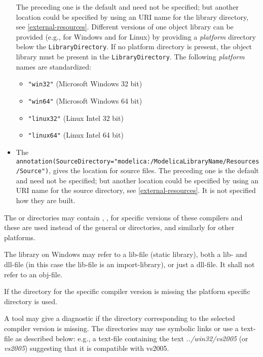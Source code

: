 \begin{itemize}
  The preceding one is the default and need not be specified; but another location could be specified by using an URI name for the library directory, see \cref{external-resources}.
  Different versions of one object library can be provided (e.g., for Windows and for Linux) by providing a \emph{platform} directory below the {\lstinline!LibraryDirectory!}.
  If no platform directory is present, the object library must be present in the {\lstinline!LibraryDirectory!}.
  The following \emph{platform} names are standardized:
  \begin{itemize}
  \item
    {\lstinline!"win32"!} (Microsoft Windows 32 bit)
  \item
    {\lstinline!"win64"!} (Microsoft Windows 64 bit)
  \item
    {\lstinline!"linux32"!} (Linux Intel 32 bit)
  \item
    {\lstinline!"linux64"!} (Linux Intel 64 bit)
  \end{itemize}
\item
  The
  {\lstinline!annotation(SourceDirectory="modelica:/ModelicaLibraryName/Resources/Source")!}, gives the location for source files.
  The preceding one is the default and need not be specified; but another location could be specified by using an URI name for the source directory, see \cref{external-resources}.
  It is not specified how they are built.
\end{itemize}

The  or  directories may contain , ,  for specific versions of these compilers and these are used instead of the general  or  directories, and similarly for other platforms.

The library on Windows may refer to a lib-file (static library), both a lib- and dll-file (in this case the lib-file is an import-library), or just a dll-file.
It shall not refer to an obj-file.

If the directory for the specific compiler version is missing the platform specific directory is used.

\begin{nonnormative}
A tool may give a diagnostic if the directory corresponding to the selected compiler version is missing.
The directories may use symbolic links or use a text-file as described below: e.g., a text-file  containing the text \emph{../win32/vs2005} (or \emph{vs2005}) suggesting that it is compatible with vs2005.
\end{nonnormative}

